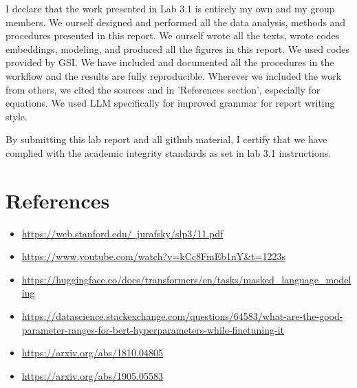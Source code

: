 \documentclass[12pt,letterpaper]{article}
\begin{document}
I declare that the work presented in Lab 3.1 is entirely my own and my group members. We ourself designed and performed all the data analysis, methods and procedures presented in this report. We ourself wrote all the texts, wrote codes embeddings, modeling, and produced all the figures in this report. We used codes provided by GSI. We have included and documented all the procedures in the workflow and the results are fully reproducible. Wherever we included the work from others, we cited the sources and in 'References section', especially for equations. We used LLM specifically for improved grammar for report writing style.

By submitting this lab report and all github material, I certify that we have complied with the academic integrity standards as set in lab 3.1 instructions. 

\section{References}

\begin{itemize}
    \item \href{https://web.stanford.edu/~jurafsky/slp3/11.pdf}{https://web.stanford.edu/~jurafsky/slp3/11.pdf}
    \item \href{https://www.youtube.com/watch?v=kCc8FmEb1nY&t=1223s}{https://www.youtube.com/watch?v=kCc8FmEb1nY&t=1223s}
     \item \href{https://huggingface.co/docs/transformers/en/tasks/masked_language_modeling}{https://huggingface.co/docs/transformers/en/tasks/masked_language_modeling}
     \item \href{https://datascience.stackexchange.com/questions/64583/what-are-the-good-parameter-ranges-for-bert-hyperparameters-while-finetuning-it}{https://datascience.stackexchange.com/questions/64583/what-are-the-good-parameter-ranges-for-bert-hyperparameters-while-finetuning-it}

     \item \href{https://arxiv.org/abs/1810.04805}{https://arxiv.org/abs/1810.04805}

     \item \href{https://arxiv.org/abs/1905.05583}{https://arxiv.org/abs/1905.05583}


    
    
\end{itemize}
\end{document}
